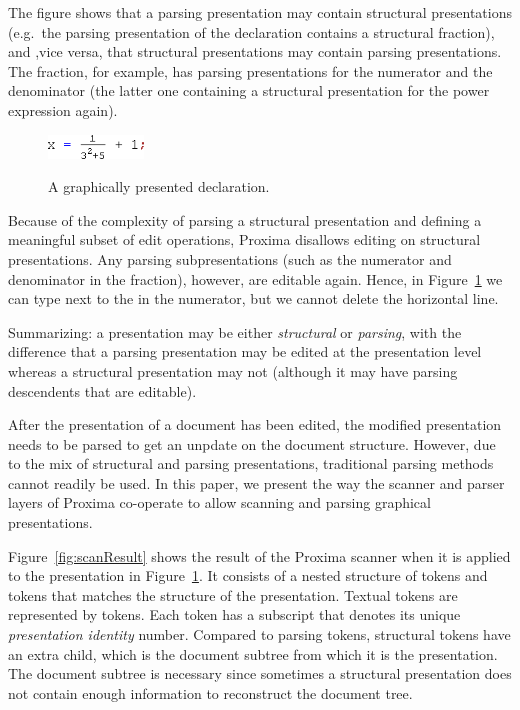 \documentclass[12pt]{article}
\begin{document}
The figure shows that a parsing presentation may contain structural presentations (e.g.\ the parsing presentation of the declaration contains a structural fraction), and ,vice versa, that structural presentations may contain parsing presentations. The fraction, for example, has parsing presentations for the numerator and the denominator (the latter one containing a structural presentation for the power expression again).


\begin{figure}
\begin{center}
\includegraphics[width=1in]{images/scanFrac}\
\end{center}
\caption{A graphically presented declaration.} \label{fig:graphicalDecl} 
\end{figure}




Because of the complexity of parsing a structural presentation and defining a meaningful subset of edit operations, Proxima disallows editing on structural presentations. Any parsing subpresentations (such as the numerator and denominator in the fraction), however, are editable again. Hence, in Figure~\ref{fig:graphicalDecl} we can type  next to the  in the numerator, but we cannot delete the horizontal line. 

Summarizing: a presentation may be either {\em structural} or {\em parsing}, with the difference that a parsing presentation may be edited at the presentation level whereas a structural presentation may not (although it may have parsing descendents that are editable). 

After the presentation of a document has been edited, the modified presentation needs to be parsed to get an unpdate on the document structure. However, due to the mix of structural and parsing presentations, traditional parsing methods cannot readily be used. In this paper, we present the way the scanner and parser layers of Proxima co-operate to allow scanning and parsing graphical presentations. 

Figure~\ref{fig:scanResult} shows the result of the Proxima scanner when it is applied to the presentation in Figure~\ref{fig:graphicalDecl}. It consists of a nested structure of  tokens and  tokens that matches the structure of the presentation. Textual tokens are represented by  tokens. Each token has a subscript that denotes its unique {\em presentation identity} number. Compared to parsing tokens, structural tokens have an extra child, which is the document subtree from which it is the presentation. The document subtree is necessary since sometimes a structural presentation does not contain enough information to reconstruct the document tree.
\end{document}
